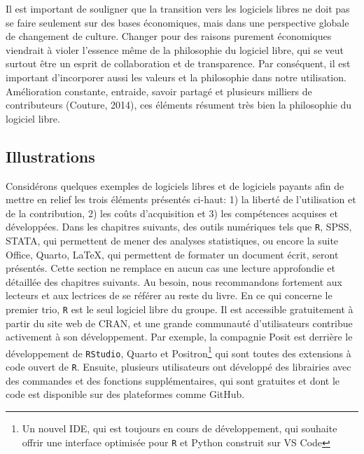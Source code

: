 \documentclass[
  letterpaper,
  DIV=11,
  numbers=noendperiod]{scrreprt}
\begin{document}
Il est important de souligner que la transition vers les logiciels
libres ne doit pas se faire seulement sur des bases économiques, mais
dans une perspective globale de changement de culture. Changer pour des
raisons purement économiques viendrait à violer l'essence même de la
philosophie du logiciel libre, qui se veut surtout être un esprit de
collaboration et de transparence. Par conséquent, il est important
d'incorporer aussi les valeurs et la philosophie dans notre utilisation.
Amélioration constante, entraide, savoir partagé et plusieurs milliers
de contributeurs (Couture, 2014), ces éléments résument très bien la
philosophie du logiciel libre.

\subsection{Illustrations}\label{illustrations}

Considérons quelques exemples de logiciels libres et de logiciels
payants afin de mettre en relief les trois éléments présentés ci-haut:
1) la liberté de l'utilisation et de la contribution, 2) les coûts
d'acquisition et 3) les compétences acquises et développées. Dans les
chapitres suivants, des outils numériques tels que \texttt{R}, SPSS,
STATA, qui permettent de mener des analyses statistiques, ou encore la
suite Office, Quarto, LaTeX, qui permettent de formater un document
écrit, seront présentés. Cette section ne remplace en aucun cas une
lecture approfondie et détaillée des chapitres suivants. Au besoin, nous
recommandons fortement aux lecteurs et aux lectrices de se référer au
reste du livre. En ce qui concerne le premier trio, \texttt{R} est le
seul logiciel libre du groupe. Il est accessible gratuitement à partir
du site web de CRAN, et une grande communauté d'utilisateurs contribue
activement à son développement. Par exemple, la compagnie Posit est
derrière le développement de \texttt{RStudio}, Quarto et
Positron\footnote{Un nouvel IDE, qui est toujours en cours de
  développement, qui souhaite offrir une interface optimisée pour
  \texttt{R} et Python construit sur VS Code} qui sont toutes des
extensions à code ouvert de \texttt{R}. Ensuite, plusieurs utilisateurs
ont développé des librairies avec des commandes et des fonctions
supplémentaires, qui sont gratuites et dont le code est disponible sur
des plateformes comme GitHub.
\end{document}
